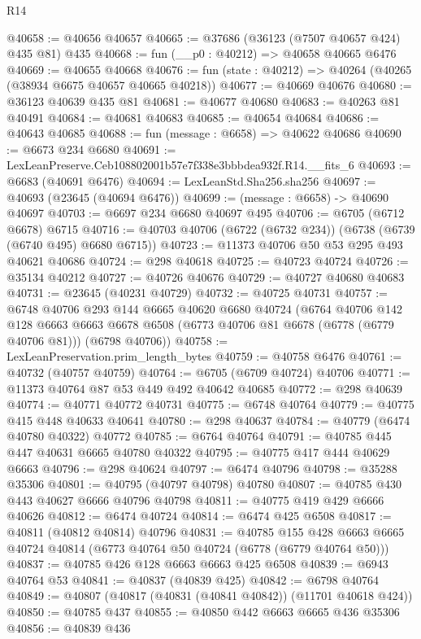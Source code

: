 \begin{lexlean}{R14}
\begin{coremodule}
@40658 := @40656 @40657
@40665 := @37686 (@36123 (@7507 @40657 @424) @435 @81) @435
@40668 := fun (__p0 : @40212) => @40658 @40665 @6476
@40669 := @40655 @40668
@40676 := fun (state : @40212) => @40264 (@40265 (@38934 @6675 @40657 @40665 @40218))
@40677 := @40669 @40676
@40680 := @36123 @40639 @435 @81
@40681 := @40677 @40680
@40683 := @40263 @81 @40491
@40684 := @40681 @40683
@40685 := @40654 @40684
@40686 := @40643 @40685
@40688 := fun (message : @6658) => @40622 @40686
@40690 := @6673 @234 @6680
@40691 := LexLeanPreserve.Ceb108802001b57e7f338e3bbbdea932f.R14.__fits_6
@40693 := @6683 (@40691 @6476)
@40694 := LexLeanStd.Sha256.sha256
@40697 := @40693 (@23645 (@40694 @6476))
@40699 := (message : @6658) -> @40690 @40697
@40703 := @6697 @234 @6680 @40697 @495
@40706 := @6705 (@6712 @6678) @6715
@40716 := @40703 @40706 (@6722 (@6732 @234)) (@6738 (@6739 (@6740 @495) @6680 @6715))
@40723 := @11373 @40706 @50 @53 @295 @493 @40621 @40686
@40724 := @298 @40618
@40725 := @40723 @40724
@40726 := @35134 @40212
@40727 := @40726 @40676
@40729 := @40727 @40680 @40683
@40731 := @23645 (@40231 @40729)
@40732 := @40725 @40731
@40757 := @6748
    @40706
    @293
    @144
    @6665
    @40620
    @6680
    @40724
    (@6764
      @40706
      @142
      @128
      @6663
      @6663
      @6678
      @6508
      (@6773 @40706 @81 @6678 (@6778 (@6779 @40706 @81)))
      (@6798 @40706))
@40758 := LexLeanPreservation.prim_length_bytes
@40759 := @40758 @6476
@40761 := @40732 (@40757 @40759)
@40764 := @6705 (@6709 @40724) @40706
@40771 := @11373 @40764 @87 @53 @449 @492 @40642 @40685
@40772 := @298 @40639
@40774 := @40771 @40772 @40731
@40775 := @6748 @40764
@40779 := @40775 @415 @448 @40633 @40641
@40780 := @298 @40637
@40784 := @40779 (@6474 @40780 @40322) @40772
@40785 := @6764 @40764
@40791 := @40785 @445 @447 @40631 @6665 @40780 @40322
@40795 := @40775 @417 @444 @40629 @6663
@40796 := @298 @40624
@40797 := @6474 @40796
@40798 := @35288 @35306
@40801 := @40795 (@40797 @40798) @40780
@40807 := @40785 @430 @443 @40627 @6666 @40796 @40798
@40811 := @40775 @419 @429 @6666 @40626
@40812 := @6474 @40724
@40814 := @6474 @425 @6508
@40817 := @40811 (@40812 @40814) @40796
@40831 := @40785
    @155
    @428
    @6663
    @6665
    @40724
    @40814
    (@6773 @40764 @50 @40724 (@6778 (@6779 @40764 @50)))
@40837 := @40785 @426 @128 @6663 @6663 @425 @6508
@40839 := @6943 @40764 @53
@40841 := @40837 (@40839 @425)
@40842 := @6798 @40764
@40849 := @40807 (@40817 (@40831 (@40841 @40842)) (@11701 @40618 @424))
@40850 := @40785 @437
@40855 := @40850 @442 @6663 @6665 @436 @35306
@40856 := @40839 @436

\end{coremodule}
\end{lexlean}
